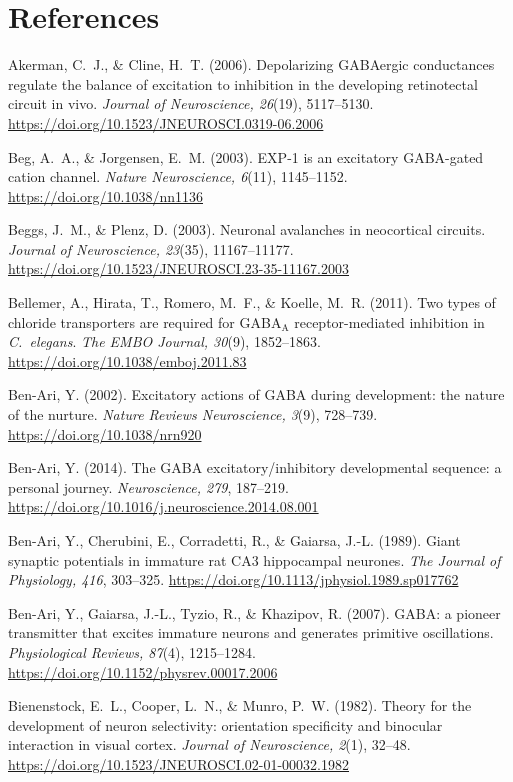 \documentclass[11pt,a4paper]{article}
\newenvironment{apabib}{\raggedright\begin{list}{}{%
  \setlength{\leftmargin}{1.6em}\setlength{\itemindent}{-1.6em}%
  \setlength{\itemsep}{3pt}\setlength{\parsep}{0pt}\setlength{\topsep}{4pt}}}%
  {\end{list}}
\begin{document}
\section*{References}
\small
\begin{apabib}
\item Akerman, C.~J., \& Cline, H.~T. (2006). Depolarizing GABAergic conductances regulate the balance of excitation to inhibition in the developing retinotectal circuit in vivo. \emph{Journal of Neuroscience, 26}(19), 5117--5130. \url{https://doi.org/10.1523/JNEUROSCI.0319-06.2006}
\item Beg, A.~A., \& Jorgensen, E.~M. (2003). EXP-1 is an excitatory GABA-gated cation channel. \emph{Nature Neuroscience, 6}(11), 1145--1152. \url{https://doi.org/10.1038/nn1136}
\item Beggs, J.~M., \& Plenz, D. (2003). Neuronal avalanches in neocortical circuits. \emph{Journal of Neuroscience, 23}(35), 11167--11177. \url{https://doi.org/10.1523/JNEUROSCI.23-35-11167.2003}
\item Bellemer, A., Hirata, T., Romero, M.~F., \& Koelle, M.~R. (2011). Two types of chloride transporters are required for GABA$_{\mathrm{A}}$ receptor-mediated inhibition in \emph{C.~elegans}. \emph{The EMBO Journal, 30}(9), 1852--1863. \url{https://doi.org/10.1038/emboj.2011.83}
\item Ben-Ari, Y. (2002). Excitatory actions of GABA during development: the nature of the nurture. \emph{Nature Reviews Neuroscience, 3}(9), 728--739. \url{https://doi.org/10.1038/nrn920}
\item Ben-Ari, Y. (2014). The GABA excitatory/inhibitory developmental sequence: a personal journey. \emph{Neuroscience, 279}, 187--219. \url{https://doi.org/10.1016/j.neuroscience.2014.08.001}
\item Ben-Ari, Y., Cherubini, E., Corradetti, R., \& Gaiarsa, J.-L. (1989). Giant synaptic potentials in immature rat CA3 hippocampal neurones. \emph{The Journal of Physiology, 416}, 303--325. \url{https://doi.org/10.1113/jphysiol.1989.sp017762}
\item Ben-Ari, Y., Gaiarsa, J.-L., Tyzio, R., \& Khazipov, R. (2007). GABA: a pioneer transmitter that excites immature neurons and generates primitive oscillations. \emph{Physiological Reviews, 87}(4), 1215--1284. \url{https://doi.org/10.1152/physrev.00017.2006}
\item Bienenstock, E.~L., Cooper, L.~N., \& Munro, P.~W. (1982). Theory for the development of neuron selectivity: orientation specificity and binocular interaction in visual cortex. \emph{Journal of Neuroscience, 2}(1), 32--48. \url{https://doi.org/10.1523/JNEUROSCI.02-01-00032.1982}

\end{apabib}
\end{document}
